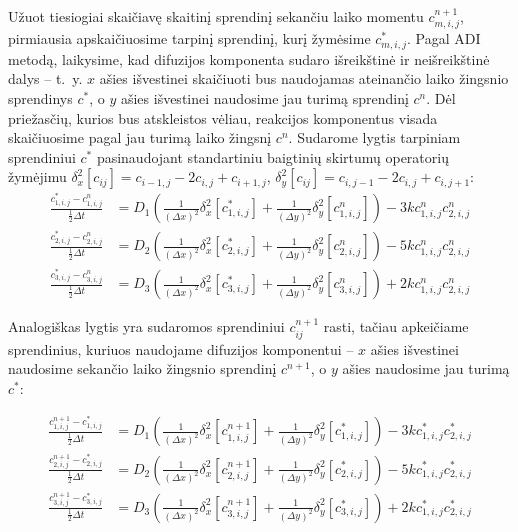 Užuot tiesiogiai skaičiavę skaitinį sprendinį sekančiu laiko momentu $c^{n+1}_{m,i,j}$, pirmiausia apskaičiuosime tarpinį sprendinį, kurį žymėsime $c^*_{m,i,j}$. Pagal ADI metodą, laikysime, kad difuzijos komponenta sudaro išreikštinė ir neišreikštinė dalys -- \hbox{t. y.} $x$ ašies išvestinei skaičiuoti bus naudojamas ateinančio laiko žingsnio sprendinys $c^*$, o $y$ ašies išvestinei naudosime jau turimą sprendinį $c^n$. Dėl priežasčių, kurios bus atskleistos vėliau, reakcijos komponentus visada skaičiuosime pagal jau turimą laiko žingsnį $c^n$. Sudarome lygtis tarpiniam sprendiniui $c^*$ pasinaudojant standartiniu baigtinių skirtumų operatorių žymėjimu $\delta_x^2[c_{ij}]=c_{i-1,j}-2c_{i,j}+c_{i+1,j}$, $\delta_y^2[c_{ij}]=c_{i,j-1}-2c_{i,j}+c_{i,j+1}$:
\begin{subequations} \label{eqs:adi-half-step}
\begin{align}
	\frac{c^*_{1,i,j} - c^n_{1,i,j}}{\frac{1}{2}\Delta t} &= D_1 \left( \frac{1}{(\Delta x)^2}\delta_x^2[c^*_{1,i,j}] + \frac{1}{(\Delta y)^2}\delta_y^2[c^n_{1,i,j}] \right) - 3kc^n_{1,i,j}c^n_{2,i,j}\\
	\frac{c^*_{2,i,j} - c^n_{2,i,j}}{\frac{1}{2}\Delta t} &= D_2 \left( \frac{1}{(\Delta x)^2}\delta_x^2[c^*_{2,i,j}] + \frac{1}{(\Delta y)^2}\delta_y^2[c^n_{2,i,j}] \right) - 5kc^n_{1,i,j}c^n_{2,i,j}\\
	\frac{c^*_{3,i,j} - c^n_{3,i,j}}{\frac{1}{2}\Delta t} &= D_3 \left( \frac{1}{(\Delta x)^2}\delta_x^2[c^*_{3,i,j}] + \frac{1}{(\Delta y)^2}\delta_y^2[c^n_{3,i,j}] \right) +2kc^n_{1,i,j}c^n_{2,i,j}
\end{align}
\end{subequations}

Analogiškas lygtis yra sudaromos sprendiniui $c^{n+1}_{ij}$ rasti, tačiau apkeičiame sprendinius, kuriuos naudojame difuzijos komponentui -- $x$ ašies išvestinei naudosime sekančio laiko žingsnio sprendinį $c^{n+1}$, o $y$ ašies naudosime jau turimą $c^*$:

\begin{subequations} \label{eqs:adi-next-step}
\begin{align}
	\frac{c^{n+1}_{1,i,j} - c^*_{1,i,j}}{\frac{1}{2}\Delta t} &= D_1 \left( \frac{1}{(\Delta x)^2}\delta_x^2[c^{n+1}_{1,i,j}] + \frac{1}{(\Delta y)^2}\delta_y^2[c^*_{1,i,j}] \right) - 3kc^*_{1,i,j}c^*_{2,i,j}\\
	\frac{c^{n+1}_{2,i,j} - c^*_{2,i,j}}{\frac{1}{2}\Delta t} &= D_2 \left( \frac{1}{(\Delta x)^2}\delta_x^2[c^{n+1}_{2,i,j}] + \frac{1}{(\Delta y)^2}\delta_y^2[c^*_{2,i,j}] \right) - 5kc^*_{1,i,j}c^*_{2,i,j}\\
	\frac{c^{n+1}_{3,i,j} - c^*_{3,i,j}}{\frac{1}{2}\Delta t} &= D_3 \left( \frac{1}{(\Delta x)^2}\delta_x^2[c^{n+1}_{3,i,j}] + \frac{1}{(\Delta y)^2}\delta_y^2[c^*_{3,i,j}] \right) +2kc^*_{1,i,j}c^*_{2,i,j}
\end{align}
\end{subequations}

